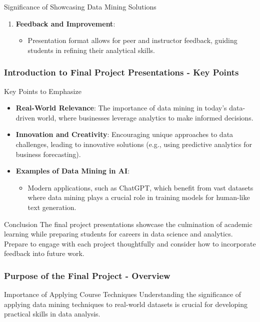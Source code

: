 \documentclass[aspectratio=169]{beamer}
\begin{document}
\begin{frame}[fragile]
\begin{block}{Significance of Showcasing Data Mining Solutions}
\begin{enumerate}
            \item \textbf{Feedback and Improvement}:
                \begin{itemize}
                    \item Presentation format allows for peer and instructor feedback, guiding students in refining their analytical skills.
                \end{itemize}
        \end{enumerate}
    \end{block}
\end{frame}

\begin{frame}[fragile]
    \frametitle{Introduction to Final Project Presentations - Key Points}
    \begin{block}{Key Points to Emphasize}
        \begin{itemize}
            \item \textbf{Real-World Relevance}: The importance of data mining in today's data-driven world, where businesses leverage analytics to make informed decisions.
            \item \textbf{Innovation and Creativity}: Encouraging unique approaches to data challenges, leading to innovative solutions (e.g., using predictive analytics for business forecasting).
            \item \textbf{Examples of Data Mining in AI}:
                \begin{itemize}
                    \item Modern applications, such as ChatGPT, which benefit from vast datasets where data mining plays a crucial role in training models for human-like text generation.
                \end{itemize}
        \end{itemize}
    \end{block}
    
    \begin{block}{Conclusion}
        The final project presentations showcase the culmination of academic learning while preparing students for careers in data science and analytics. Prepare to engage with each project thoughtfully and consider how to incorporate feedback into future work.
    \end{block}
\end{frame}

\begin{frame}[fragile]
    \frametitle{Purpose of the Final Project - Overview}
    \begin{block}{Importance of Applying Course Techniques}
        Understanding the significance of applying data mining techniques to real-world datasets is crucial for developing practical skills in data analysis.
    \end{block}
\end{frame}
\end{document}
